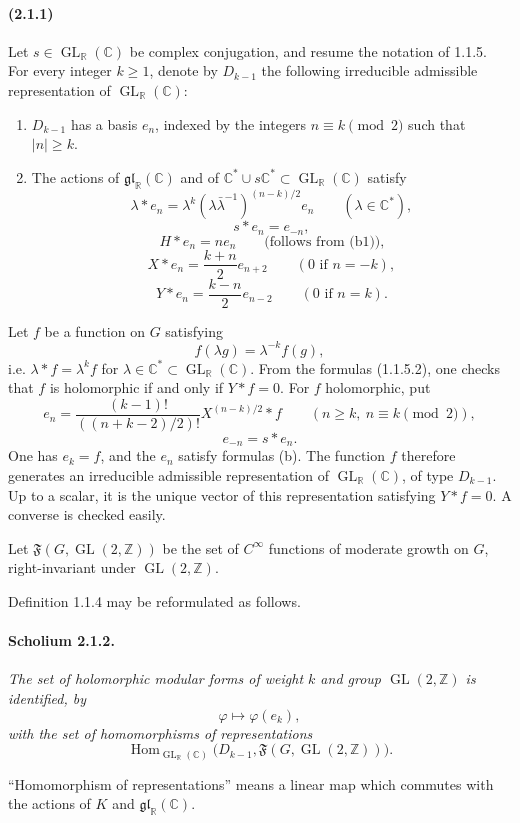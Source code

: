 \documentclass[10pt,a4paper]{article}
\providecommand{\GL}{\operatorname{GL}}
\providecommand{\Hom}{\operatorname{Hom}}
\providecommand{\R}{\mathbb R}
\providecommand{\Z}{\mathbb Z}
\providecommand{\C}{\mathbb C}
\begin{document}
\paragraph{(2.1.1)} Let \(s\in \GL_{\R}(\C)\) be complex conjugation, and resume the notation of 1.1.5. For every integer \(k\ge1\), denote by \(D_{k-1}\) the following irreducible admissible representation of \(\GL_{\R}(\C)\):
\begin{enumerate}[label=(\alph*)]
\item \(D_{k-1}\) has a basis \(e_n\), indexed by the integers \(n\equiv k\pmod 2\) such that \(|n|\ge k\).
\item The actions of \(\mathfrak{gl}_{\R}(\C)\) and of \(\C^*\cup s\C^*\subset \GL_{\R}(\C)\) satisfy
\[
\tag{b1}
\lambda*e_n=\lambda^k(\lambda\bar\lambda^{-1})^{(n-k)/2}e_n
\qquad(\lambda\in\C^*),
\]
\[
\tag{b2}
s*e_n=e_{-n},
\]
\[
\tag{b3}
H*e_n=n e_n
\qquad\text{(follows from (b1)),}
\]
\[
\tag{b4}
X*e_n=\frac{k+n}{2}e_{n+2}
\qquad(0\text{ if }n=-k),
\]
\[
\tag{b5}
Y*e_n=\frac{k-n}{2}e_{n-2}
\qquad(0\text{ if }n=k).
\]
\end{enumerate}

Let \(f\) be a function on \(G\) satisfying
\[
f(\lambda g)=\lambda^{-k}f(g),
\]
i.e. \(\lambda*f=\lambda^k f\) for \(\lambda\in\C^*\subset \GL_{\R}(\C)\). From the formulas (1.1.5.2), one checks that \(f\) is holomorphic if and only if \(Y*f=0\). For \(f\) holomorphic, put
\[
e_n=\frac{(k-1)!}{((n+k-2)/2)!}X^{(n-k)/2}*f
\qquad(n\ge k,\ n\equiv k\pmod2),
\]
\[
e_{-n}=s*e_n.
\]
One has \(e_k=f\), and the \(e_n\) satisfy formulas (b). The function \(f\) therefore generates an irreducible admissible representation of \(\GL_{\R}(\C)\), of type \(D_{k-1}\). Up to a scalar, it is the unique vector of this representation satisfying \(Y*f=0\). A converse is checked easily.

Let \(\mathfrak F(G,\GL(2,\Z))\) be the set of \(C^\infty\) functions of moderate growth on \(G\), right-invariant under \(\GL(2,\Z)\).

\clearpage
{}
\hypertarget{authority-23}{}
Definition 1.1.4 may be reformulated as follows.

\paragraph{Scholium 2.1.2.}{\itshape  The set of holomorphic modular forms of weight \(k\) and group \(\GL(2,\Z)\) is identified, by
\[
\varphi\longmapsto\varphi(e_k),
\]
with the set of homomorphisms of representations
\[
\Hom_{\GL_{\R}(\C)}\bigl(D_{k-1},\mathfrak F(G,\GL(2,\Z))\bigr).
\]
\par}
“Homomorphism of representations” means a linear map which commutes with the actions of \(K\) and \(\mathfrak{gl}_{\R}(\C)\).
\end{document}
